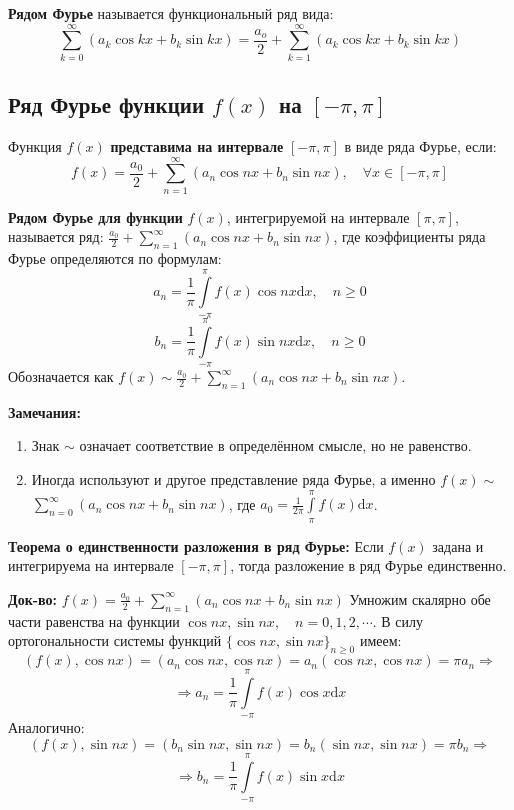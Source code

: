 \documentclass[12pt, a4paper]{article}
\newcommand{\di}{\mathrm{d}}
\begin{document}
\textbf{Рядом Фурье} называется функциональный ряд вида:
\[\sum_{k=0}^{\infty} (a_k \cos kx + b_k \sin kx) = \frac{a_o}{2} + \sum_{k=1}^{\infty} (a_k \cos kx + b_k \sin kx) \]

\subsection{Ряд Фурье функции $f(x)$ на $[-\pi, \pi]$}

Функция $f(x)$ \textbf{представима на интервале} $[-\pi, \pi]$ в виде ряда Фурье, если:
\[f(x) = \frac{a_0}{2} + \sum_{n=1}^{\infty} (a_n \cos nx + b_n \sin nx), \quad \forall x \in [-\pi, \pi] \]

\textbf{Рядом Фурье для функции} $f(x)$, интегрируемой на интервале $[\pi, \pi]$, называется ряд: $\frac{a_0}{2} + \sum_{n=1}^{\infty} (a_n \cos nx + b_n \sin nx)$, где коэффициенты ряда Фурье определяются по формулам:
\[a_n = \frac{1}{\pi} \int \limits_{-\pi}^{\pi} f(x) \cos nx \di x, \quad n \geq 0 \]
\[b_n = \frac{1}{\pi} \int \limits_{-\pi}^{\pi} f(x) \sin nx \di x, \quad n \geq 0 \]
Обозначается как $f(x) \sim \frac{a_0}{2} + \sum_{n=1}^{\infty} (a_n \cos nx + b_n \sin nx)$.

\textbf{Замечания:}
\begin{enumerate}
 \item Знак $\sim$ означает соответствие в определённом смысле, но не равенство.
 \item Иногда используют и другое представление ряда Фурье, а именно $f(x) \sim$ \\ $\sum_{n=0}^{\infty} (a_n \cos nx + b_n \sin nx)$, где $a_0 = \frac{1}{2\pi} \int \limits_{\pi}^{\pi} f(x) \di x$.
\end{enumerate}

\textbf{Теорема о единственности разложения в ряд Фурье:} Если $f(x)$ задана и интегрируема на интервале $[-\pi, \pi]$, тогда разложение в ряд Фурье единственно.

\textbf{Док-во:} $f(x) = \frac{a_0}{2} + \sum_{n=1}^{\infty} (a_n \cos nx + b_n \sin nx)$
Умножим скалярно обе части равенства на функции $\cos nx, \sin nx, \quad n = 0, 1, 2, \cdots$. В силу ортогональности системы функций $\{\cos nx, \sin nx \}_{n \geq 0}$ имеем:
\[(f(x), \cos nx) = (a_n \cos nx, \cos nx) = a_n(\cos nx, \cos nx) = \pi a_n \Rightarrow \]
\[\Rightarrow a_n = \frac{1}{\pi} \int \limits_{-\pi}^{\pi} f(x) \cos x \di x \]
Аналогично:
\[(f(x), \sin nx) = (b_n \sin nx, \sin nx) = b_n(\sin nx, \sin nx) = \pi b_n \Rightarrow \]
\[\Rightarrow b_n = \frac{1}{\pi} \int \limits_{-\pi}^{\pi} f(x) \sin x \di x \]
\end{document}
